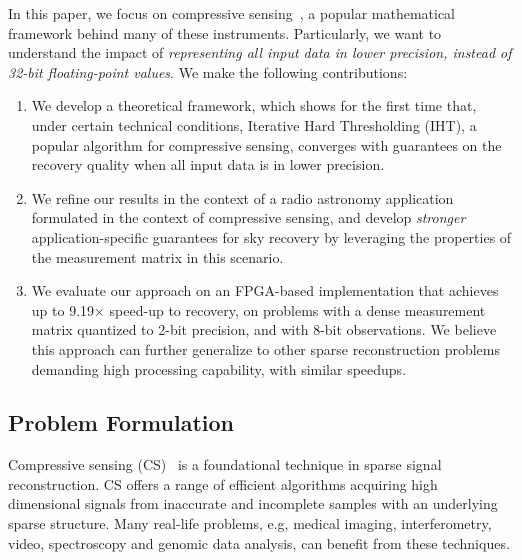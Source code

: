 \documentclass{article}
\begin{document}
In this paper, we focus on compressive sensing~\cite{donoho2006cs, candes2006cs, candes2006cs2}, a popular mathematical framework behind many of these instruments. Particularly, we want to understand 
the impact of {\em representing all input data
in lower precision, instead of 32-bit floating-point values}. 
We make the following contributions:

\begin{enumerate}
\item We develop a theoretical framework, which shows for the first time that, under certain
technical conditions, Iterative Hard Thresholding (IHT),
a popular algorithm for compressive sensing, converges
with guarantees on the recovery quality when all 
input data is in lower precision.
\item We refine our results in the context of a radio
astronomy application formulated in
the context of compressive sensing, 
and develop {\em stronger} application-specific 
guarantees for sky recovery by leveraging the properties of the measurement matrix in this scenario.
 
\item We evaluate our approach on an FPGA-based
implementation that achieves up to 9.19$\times$ speed-up to recovery,  
on problems with a dense measurement matrix quantized to 2-bit precision, and with 8-bit observations.
We believe this approach can further generalize to other sparse reconstruction problems demanding high processing capability, with  similar
speedups.
\end{enumerate}




\subsection{Problem Formulation}
Compressive sensing (CS)~\cite{donoho2006cs, candes2006cs, candes2006cs2} is a foundational technique in sparse signal reconstruction. CS offers a range of efficient algorithms acquiring high dimensional signals from inaccurate and incomplete samples with an underlying sparse structure. 
Many real-life problems, e.g, medical imaging, interferometry, video, spectroscopy and genomic data analysis, can benefit from these techniques.
\end{document}
